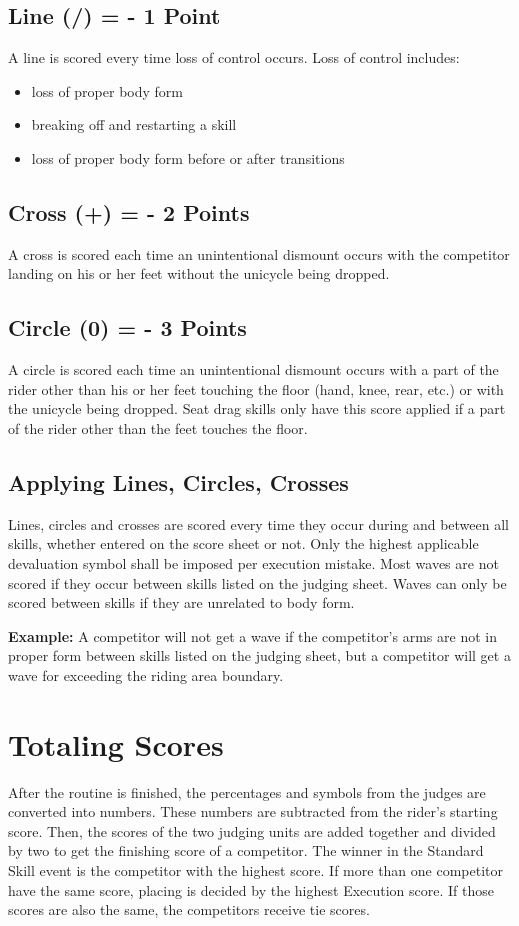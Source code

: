 \subsection{Line (/) = - 1 Point}

A line is scored every time loss of control occurs.
Loss of control includes:
\begin{itemize}
\item loss of proper body form 
\item breaking off and restarting a skill 
\item loss of proper body form before or after transitions
\end{itemize}

\subsection{Cross (+) = - 2 Points}

A cross is scored each time an unintentional dismount occurs with the competitor landing on his or her feet without the unicycle being dropped.

\subsection{Circle (0) = - 3 Points}

A circle is scored each time an unintentional dismount occurs with a part of the rider other than his or her feet touching the floor (hand, knee, rear, etc.) or with the unicycle being dropped.
Seat drag skills only have this score applied if a part of the rider other than the feet touches the floor.

\subsection{Applying Lines, Circles, Crosses}

Lines, circles and crosses are scored every time they occur during and between all skills, whether entered on the score sheet or not.
Only the highest applicable devaluation symbol shall be imposed per execution mistake.
Most waves are not scored if they occur between skills listed on the judging sheet.
Waves can only be scored between skills if they are unrelated to body form.

\textbf{Example:} A competitor will not get a wave if the competitor's arms are not in proper form between skills listed on the judging sheet, but a competitor will get a wave for exceeding the riding area boundary.

\section{Totaling Scores}
After the routine is finished, the percentages and symbols from the judges are converted into numbers.
These numbers are subtracted from the rider's starting score.
Then, the scores of the two judging units are added together and divided by two to get the finishing score of a competitor.
The winner in the Standard Skill event is the competitor with the highest score.
If more than one competitor have the same score, placing is decided by the highest Execution score.
If those scores are also the same, the competitors receive tie scores.
